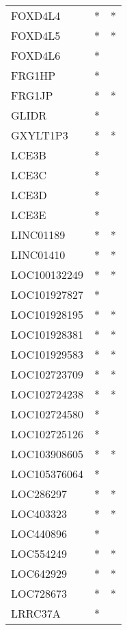 \begin{longtable}{lcc}
FOXD4L4            &         * &       * \\
FOXD4L5            &         * &       * \\
FOXD4L6            &         * &         \\
FRG1HP             &         * &         \\
FRG1JP             &         * &       * \\
GLIDR              &         * &         \\
GXYLT1P3           &         * &       * \\
LCE3B              &         * &         \\
LCE3C              &         * &         \\
LCE3D              &         * &         \\
LCE3E              &         * &         \\
LINC01189          &         * &       * \\
LINC01410          &         * &       * \\
LOC100132249       &         * &       * \\
LOC101927827       &         * &         \\
LOC101928195       &         * &       * \\
LOC101928381       &         * &       * \\
LOC101929583       &         * &       * \\
LOC102723709       &         * &       * \\
LOC102724238       &         * &       * \\
LOC102724580       &         * &         \\
LOC102725126       &         * &         \\
LOC103908605       &         * &       * \\
LOC105376064       &         * &         \\
LOC286297          &         * &       * \\
LOC403323          &         * &       * \\
LOC440896          &         * &         \\
LOC554249          &         * &       * \\
LOC642929          &         * &       * \\
LOC728673          &         * &       * \\
LRRC37A            &         * &         \\

\end{longtable}
